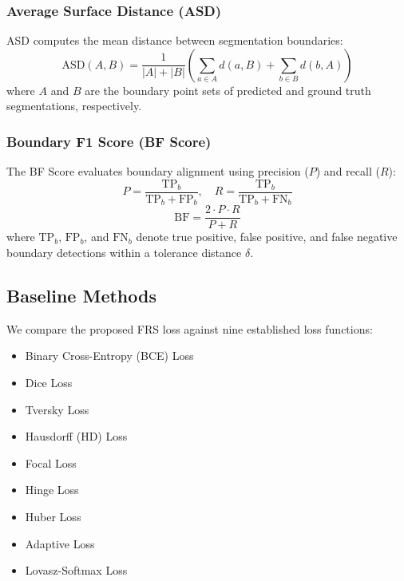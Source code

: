 \documentclass[review]{elsarticle}
\begin{document}
\subsubsection{Average Surface Distance (ASD)}
ASD computes the mean distance between segmentation boundaries:
\begin{equation}
    \text{ASD}(A, B) = \frac{1}{|A| + |B|} \left( \sum_{a \in A} d(a, B) + \sum_{b \in B} d(b, A) \right)
\end{equation}
where $A$ and $B$ are the boundary point sets of predicted and ground truth segmentations, respectively.

\subsubsection{Boundary F1 Score (BF Score)}
The BF Score evaluates boundary alignment using precision ($P$) and recall ($R$):
\begin{equation}
    P = \frac{\text{TP}_b}{\text{TP}_b + \text{FP}_b}, \quad R = \frac{\text{TP}_b}{\text{TP}_b + \text{FN}_b}
\end{equation}
\begin{equation}
    \text{BF} = \frac{2 \cdot P \cdot R}{P + R}
\end{equation}
where $\text{TP}_b$, $\text{FP}_b$, and $\text{FN}_b$ denote true positive, false positive, and false negative boundary detections within a tolerance distance $\delta$.

\subsection{Baseline Methods}
We compare the proposed FRS loss against nine established loss functions:
\begin{itemize}
    \item Binary Cross-Entropy (BCE) Loss
    \item Dice Loss \cite{Zhao2020}
    \item Tversky Loss \cite{salehi2017tversky}
    \item Hausdorff (HD) Loss \cite{karimi2019reducing}
    \item Focal Loss \cite{lin2017focal}
    \item Hinge Loss \cite{tang2018deep}
    \item Huber Loss \cite{huber1964robust}
    \item Adaptive Loss \cite{Dar2025}
    \item Lovasz-Softmax Loss \cite{Berman2018}
\end{itemize}
\end{document}
